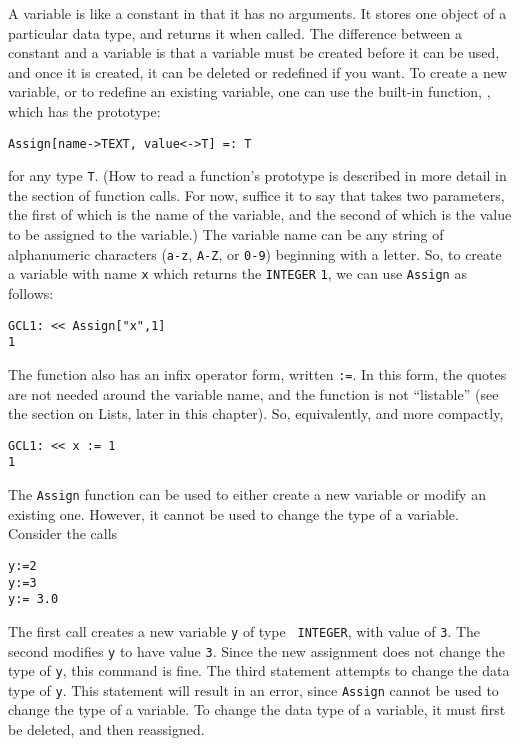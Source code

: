 A variable is like a constant in that it has no arguments.  It stores
one object of a particular data type, and returns it when called. The
difference between a constant and a variable is that a variable must
be created before it can be used, and once it is created, it can be
deleted or redefined if you want.  To create a new variable, or to
redefine an existing variable, one can use the built-in function,
, which has the prototype:
\begin{verbatim}
Assign[name->TEXT, value<->T] =: T
\end{verbatim}
\noindent 
for any type \verb+T+.  (How to read a function's prototype is
described in more detail in the section of function calls.  For now,
suffice it to say that  takes two parameters, the first of
which is the name of the variable, and the second of which is the
value to be assigned to the variable.)  The variable name can be any
string of alphanumeric characters (\verb+a-z+, \verb+A-Z+, or
\verb+0-9+) beginning with a letter.  So, to create a variable with
name \verb+x+ which returns the \verb+INTEGER+ \verb+1+, we can use
\verb+Assign+ as follows:

\begin{verbatim}
GCL1: << Assign["x",1]
1
\end{verbatim}


\noindent 
The  function also has an infix operator form, written
{\tt :=}.  In this form, the quotes are not needed around the variable
name, and the function is not ``listable'' (see the section on Lists,
later in this chapter).  So, equivalently, and more compactly,

\begin{verbatim}
GCL1: << x := 1
1
\end{verbatim}

The {\tt Assign} function can be used to either create a new variable or
modify an existing one.  However, it cannot be used to change the type
of a variable.  Consider the calls

\begin{verbatim}
y:=2
y:=3
y:= 3.0
\end{verbatim}

\noindent The first call creates a new variable {\tt y} of type {\tt
INTEGER}, with value of \verb+3+.  The second modifies \verb+y+ to
have value \verb+3+.  Since the new assignment does not change the
type of \verb+y+, this command is fine.  The third statement attempts
to change the data type of \verb+y+.  This statement will result in an
error, since {\tt Assign} cannot be used to change the type of a
variable.  To change the data type of a variable, it must first be
deleted, and then reassigned.  

